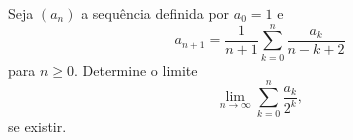 Seja \((a_{n})\) a sequência definida por \(a_{0}=1\) e \[a_{n+1}=\frac{1}{n+1} \sum_{k=0}^{n}\frac{a_k}{n-k+2}\] para \(n \geq 0\).
Determine o limite \[\lim_{n \rightarrow \infty} \sum_{k=0}^{n}\dfrac{a_{k}}{2^{k}},\] se existir.